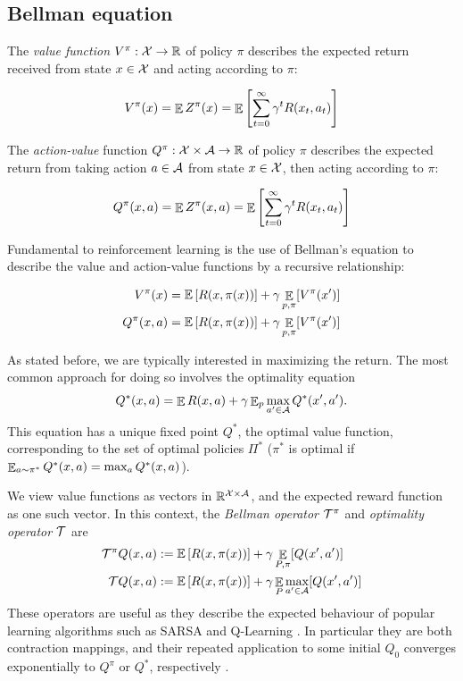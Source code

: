 \subsection{Bellman equation}

The \textit{value function} $V^\pi : \mathcal{X}\to\mathbb{R}$ of policy $\pi$ describes the expected return received from state $x \in \mathcal{X}$ and acting according to $\pi$:

\begin{equation}
V^\pi(x) = \mathop{\mathbb{E}} Z^\pi(x) = \mathop{\mathbb{E}}\left[\sum_{t=0}^\infty \gamma^tR(x_t,a_t) \right]
\end{equation}


The \textit{action-value} function $Q^\pi : \mathcal{X}\times\mathcal{A}\to\mathbb{R}$ of policy $\pi$ describes the expected return from taking action $a \in \mathcal{A}$ from state $x \in \mathcal{X}$, then acting according to $\pi$:

\begin{equation}
Q^\pi(x, a) = \mathop{\mathbb{E}} Z^\pi(x, a) = \mathop{\mathbb{E}}\left[ \sum_{t=0}^\infty \gamma^tR(x_t,a_t) \right]
\end{equation}

Fundamental to reinforcement learning is the use of Bellman’s equation \citep{bellman1957markovian} to describe the value and action-value functions by a recursive relationship:

\begin{align}
V^\pi(x) &= \mathbb{E}\left[ { R(x, \pi(x))} \right] + \gamma \mathop{\mathbb{E}}\limits_{p, \pi}[ V^\pi(x')]\\
Q^\pi(x, a) &= \mathbb{E}\left[ { R(x, \pi(x))} \right] + \gamma \mathop{\mathbb{E}}_{p, \pi}[ V^\pi(x')]
\end{align}

As stated before, we are typically interested in maximizing the return. The most common approach for doing so involves the optimality equation
\begin{equation*}
Q^*(x,a) = \mathop{\mathbb{E}} R(x,a) + \gamma \mathop{\mathbb{E}}\nolimits_p \max_{a' \in \mathcal{A}} Q^*(x', a') .
\end{equation*}
This equation has a unique fixed point $Q^*$, the optimal value function, corresponding to the set of optimal policies $\Pi^*$ ($\pi^*$ is optimal if $\mathop{\mathbb{E}}_{a \sim \pi^*} Q^*(x, a) = \max_a Q^*(x,a)$). 

We view value functions as vectors in $\mathbb{R}^{\mathcal{X} \times \mathcal{A}}$, and the expected reward function as one such vector. In this context, the \emph{Bellman operator} $\mathcal{T}^\pi$ and \emph{optimality operator} $\mathcal{T}$ are
\begin{align}
\mathcal{T}^\pi Q(x,a) &:= \mathbb{E}\left[ { R(x, \pi(x))} \right] + \gamma \mathop{\mathbb{E}}_{P, \pi} [Q(x',a')]\\
\mathcal{T} Q(x,a) &:= \mathbb{E}\left[ { R(x, \pi(x))} \right] + \gamma \mathop{\mathbb{E}}_{P} \max_{a' \in \mathcal{A}}[ Q(x', a')]
\end{align}
These operators are useful as they describe the expected behaviour of popular learning algorithms such as SARSA and Q-Learning \cite{sutton1998reinforcement}. In particular they are both contraction mappings, and their repeated application to some initial $Q_0$ converges exponentially to $Q^\pi$ or $Q^*$, respectively \citep{bertsekas1995neuro}.


